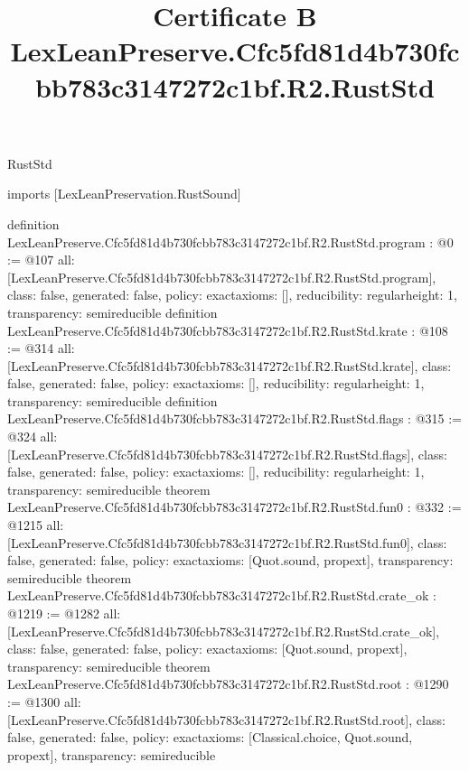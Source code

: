 \begin{lexlean}{RustStd}
\title{Certificate B LexLeanPreserve.Cfc5fd81d4b730fcbb783c3147272c1bf.R2.RustStd}
\begin{coremodule}
imports [LexLeanPreservation.RustSound]

definition LexLeanPreserve.Cfc5fd81d4b730fcbb783c3147272c1bf.R2.RustStd.program : @0 := @107 {
  all: [LexLeanPreserve.Cfc5fd81d4b730fcbb783c3147272c1bf.R2.RustStd.program],
  class: false,
  generated: false,
  policy: exact{axioms: []},
  reducibility: regular{height: 1},
  transparency: semireducible
}
definition LexLeanPreserve.Cfc5fd81d4b730fcbb783c3147272c1bf.R2.RustStd.krate : @108 := @314 {
  all: [LexLeanPreserve.Cfc5fd81d4b730fcbb783c3147272c1bf.R2.RustStd.krate],
  class: false,
  generated: false,
  policy: exact{axioms: []},
  reducibility: regular{height: 1},
  transparency: semireducible
}
definition LexLeanPreserve.Cfc5fd81d4b730fcbb783c3147272c1bf.R2.RustStd.flags : @315 := @324 {
  all: [LexLeanPreserve.Cfc5fd81d4b730fcbb783c3147272c1bf.R2.RustStd.flags],
  class: false,
  generated: false,
  policy: exact{axioms: []},
  reducibility: regular{height: 1},
  transparency: semireducible
}
theorem LexLeanPreserve.Cfc5fd81d4b730fcbb783c3147272c1bf.R2.RustStd.fun0 : @332 := @1215 {
  all: [LexLeanPreserve.Cfc5fd81d4b730fcbb783c3147272c1bf.R2.RustStd.fun0],
  class: false,
  generated: false,
  policy: exact{axioms: [Quot.sound, propext]},
  transparency: semireducible
}
theorem LexLeanPreserve.Cfc5fd81d4b730fcbb783c3147272c1bf.R2.RustStd.crate_ok : @1219 := @1282 {
  all: [LexLeanPreserve.Cfc5fd81d4b730fcbb783c3147272c1bf.R2.RustStd.crate_ok],
  class: false,
  generated: false,
  policy: exact{axioms: [Quot.sound, propext]},
  transparency: semireducible
}
theorem LexLeanPreserve.Cfc5fd81d4b730fcbb783c3147272c1bf.R2.RustStd.root : @1290 := @1300 {
  all: [LexLeanPreserve.Cfc5fd81d4b730fcbb783c3147272c1bf.R2.RustStd.root],
  class: false,
  generated: false,
  policy: exact{axioms: [Classical.choice, Quot.sound, propext]},
  transparency: semireducible
}


\end{coremodule}
\end{lexlean}
